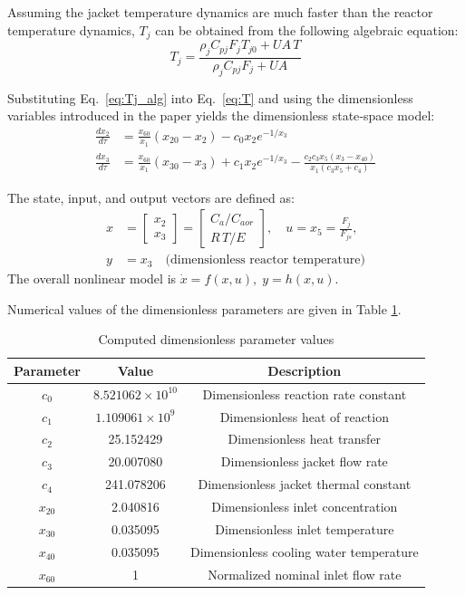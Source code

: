 \documentclass[12pt,a4paper]{article}
\begin{document}
Assuming the jacket temperature dynamics are much faster than the reactor temperature dynamics, $T_j$ can be obtained from the following algebraic equation:
\begin{equation}
T_j = \frac{\rho_j C_{pj} F_j T_{j0} + UA\, T}{\rho_j C_{pj} F_j + UA} \label{eq:Tj_alg}
\end{equation}

Substituting Eq.~\eqref{eq:Tj_alg} into Eq.~\eqref{eq:T} and using the dimensionless variables introduced in the paper yields the dimensionless state‑space model:
\begin{align}
\frac{dx_2}{d\tau} &= \frac{x_{60}}{x_1}(x_{20}-x_2) - c_0 x_2 e^{-1/x_3} \label{eq:x2}\\
\frac{dx_3}{d\tau} &= \frac{x_{60}}{x_1}(x_{30}-x_3) + c_1 x_2 e^{-1/x_3} - \frac{c_2 c_3 x_5 (x_3-x_{40})}{x_1(c_3 x_5 + c_4)} \label{eq:x3}
\end{align}

The state, input, and output vectors are defined as:
\begin{align*}
x &= \begin{bmatrix} x_2 \\ x_3 \end{bmatrix} = \begin{bmatrix} C_a / C_{aor} \\ R\,T / E \end{bmatrix}, \quad
u = x_5 = \frac{F_j}{F_{js}},\\[4pt]
y &= x_3 \quad \text{(dimensionless reactor temperature)}
\end{align*}
The overall nonlinear model is $\dot{x} = f(x,u), \; y = h(x,u)$.

Numerical values of the dimensionless parameters are given in Table \ref{tab:dimless_param}.
\begin{table}[H]
\centering
\caption{Computed dimensionless parameter values}
\label{tab:dimless_param}
\begin{tabular}{c|c|c}
\toprule
\textbf{Parameter} & \textbf{Value} & \textbf{Description} \\
\midrule
$c_0$ & $8.521062 \times 10^{10}$ & Dimensionless reaction rate constant \\
$c_1$ & $1.109061 \times 10^{9}$ & Dimensionless heat of reaction \\
$c_2$ & 25.152429 & Dimensionless heat transfer \\
$c_3$ & 20.007080 & Dimensionless jacket flow rate \\
$c_4$ & 241.078206 & Dimensionless jacket thermal constant \\
$x_{20}$ & 2.040816 & Dimensionless inlet concentration \\
$x_{30}$ & 0.035095 & Dimensionless inlet temperature \\
$x_{40}$ & 0.035095 & Dimensionless cooling water temperature \\
$x_{60}$ & 1 & Normalized nominal inlet flow rate \\
\bottomrule
\end{tabular}
\end{table}
\end{document}
